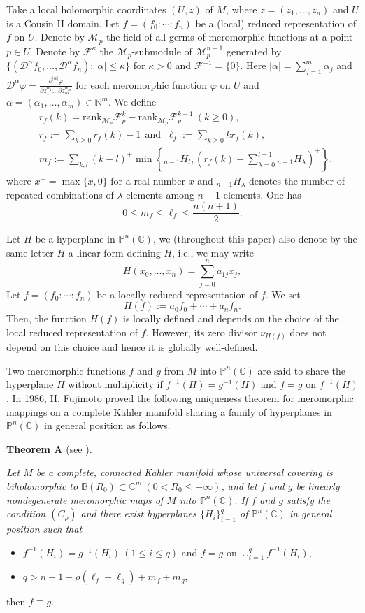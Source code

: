 \documentclass[12pt, a4paper, oneside]{amsart}
\newcommand{\C}{{\mathbb{C}}}
\newcommand{\B}{\mathbb{B}}
\renewcommand{\P}{{\mathbb{P}}}
\numberwithin{equation}{section}
\begin{document}
Take a local holomorphic coordinates $(U,z)$ of $M$, where $z=(z_1,\ldots,z_n)$ and $U$ is a Cousin II domain. Let $f=(f_0:\cdots:f_n)$ be a (local) reduced representation of $f$ on $U$. Denote by $\mathcal M_p$ the field of all germs of meromorphic functions at a point $p\in U$. Denote by $\mathcal F^{\kappa}$ the $\mathcal M_p$-submodule of $\mathcal M^{n+1}_p$ generated by $\{(\mathcal D^{\alpha}f_0,\ldots,\mathcal D^{\alpha}f_n):|\alpha|\le \kappa\}$ for $\kappa>0$ and $\mathcal F^{-1}=\{0\}$. Here $|\alpha|=\sum_{j=1}^m\alpha_j$ and $\mathcal D^{\alpha}\varphi=\frac{\partial^{|\alpha|}\varphi}{\partial z_1^{\alpha_1}\ldots\partial z_m^{\alpha_m}}$ for each meromorphic function $\varphi$ on $U$ and $\alpha=(\alpha_1,\ldots,\alpha_m)\in\mathbb N^m$. We define
\begin{align*}
&r_f(k)=\text{rank}_{\mathcal M_p}\mathcal F_p^k-\text{rank}_{\mathcal M_p}\mathcal F_p^{k-1}\ (k\ge 0),\\ 
&r_f:=\sum_{k\ge 0}r_f(k)-1\ \ \text{and }\  \ell_f:=\sum_{k\ge 0}kr_f(k),\\
&m_f:=\sum_{k, l}(k-l)^{+} \min \left\{{ }_{n-1} H_l,\left(r_f(k)-\sum_{\lambda=0}^{l-1}{ }_{n-1} H_\lambda\right)^{+}\right\},
\end{align*}
where $x^{+}=\max \{x, 0\}$ for a real number $x$ and ${ }_{n-1} H_\lambda$ denotes the number of repeated combinations of $\lambda$ elements among $n-1$ elements. One has
$$0 \le m_f \le \ell_f \le \frac{n(n+1)}{2}.$$

Let $H$ be a hyperplane in $\P^n(\C)$, we (throughout this paper) also denote by the same letter $H$ a linear form defining $H$, i.e., we may write
$$H(x_0,\ldots,x_n)=\sum_{j=0}^na_{1j}x_j,$$
Let $f=(f_0:\cdots:f_n)$ be a locally reduced representation of $f$. We set 
$$ H(f):=a_0f_0+\cdots+a_nf_n. $$
Then, the function $H(f)$ is locally defined and depends on the choice of the local reduced representation of $f$. However, its zero divisor $\nu_{H(f)}$ does not depend on this choice and hence it is globally well-defined.

Two meromorphic functions $f$ and $g$ from $M$ into $\P^n(\C)$ are said to share the hyperplane $H$ without multiplicity if $f^{-1}(H)=g^{-1}(H)$ and $f=g$ on $f^{-1}(H)$. In 1986, H. Fujimoto \cite{Fu86} proved the following uniqueness theorem for meromorphic mappings on a complete K\"{a}hler manifold sharing a family of hyperplanes in $\P^n(\C)$ in general position as follows.

\vskip0.1cm 
\noindent
{\bf Theorem A} (see \cite[Main Theorem]{Fu86}). {\it Let $M$ be a complete, connected K\"{a}hler manifold whose universal covering is biholomorphic to $\B(R_0) \subset \C^m\ (0<R_0\le +\infty)$, and let $f$ and $g$ be linearly nondegenerate meromorphic maps of $M$ into $\P^n(\C)$. If $f$ and $g$ satisfy the condition $(C_\rho)$ and there exist hyperplanes $\{H_i\}_{i=1}^q$ of $\P^n(\C)$ in general position such that
\begin{itemize}
\item[(i)] $f^{-1}(H_i)=g^{-1}(H_i)\ (1\le i\le q)$ and $f=g$ on $\cup_{i=1}^q f^{-1}(H_i),$
\item[(ii)] $q>n+1+\rho(\ell_f+\ell_g)+m_f+m_g,$
\end{itemize}
then $f\equiv g$.}
\end{document}
